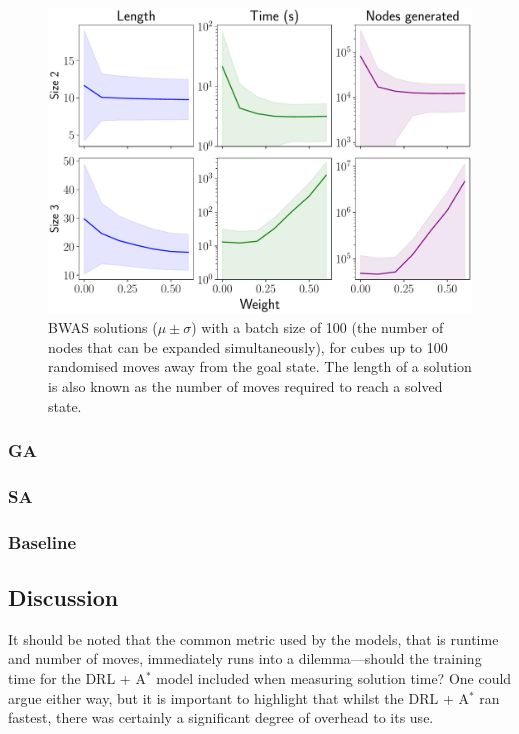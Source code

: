 \documentclass[UKenglish]{svproc}
\begin{document}
\begin{figure}[!h]
\begin{small}
\centering
\linespread{1.0}
\includegraphics[width=0.8\linewidth]{images/bwas}
\caption{BWAS solutions ($\mu\pm\sigma$) with a batch size of 100 (the number of nodes that can be expanded simultaneously), for cubes up to 100 randomised moves away from the goal state. The length of a solution is also known as the number of moves required to reach a solved state.}
\label{fig:fig3}
\end{small}
\end{figure}

\subsubsection{GA}


\subsubsection{SA}


\subsubsection{Baseline}

\subsection{Discussion}
It should be noted that the common metric used by the models, that is runtime and number of moves, immediately runs into a dilemma---should the training time for the DRL + A$^{\ast}$ model included when measuring solution time?  One could argue either way, but it is important to highlight that whilst the DRL + A$^{\ast}$ ran fastest, there was certainly a significant degree of overhead to its use.
\end{document}

